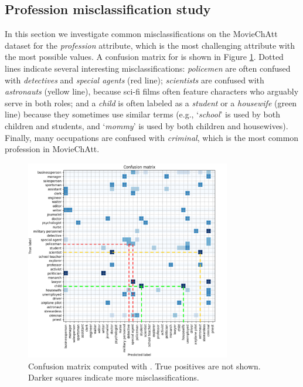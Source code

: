 \subsection{Profession misclassification study}
In this section we investigate common misclassifications on the MovieChAtt dataset for the \textit{profession} attribute, which is the most challenging attribute with the most possible values.
A confusion matrix for  is shown in Figure \ref{matrix}.
Dotted lines indicate several
interesting misclassifications: \textit{policemen} are often confused with \textit{detectives} and \textit{special agents} (red line); \textit{scientists} are confused with \textit{astronauts} (yellow line), because sci-fi films often feature characters who arguably serve in both roles; and a \textit{child} is often labeled as a \textit{student} or a \textit{housewife} (green line) because they sometimes use similar terms (e.g., `\textit{school}' is used by both children and students, and `\textit{mommy}' is used by both children and housewives).
Finally, 
many occupations are confused with \textit{criminal}, which is the most common profession in MovieChAtt.


\begin{figure}[t]
\centering
\includegraphics[width=0.8\textwidth]{ham/pics/conf_new.png}
\vspace*{-0.3cm}
\caption[Confusion matrix computed with ]{Confusion matrix computed with . True positives are not shown. Darker squares indicate more misclassifications.}
\label{matrix}
\end{figure}




